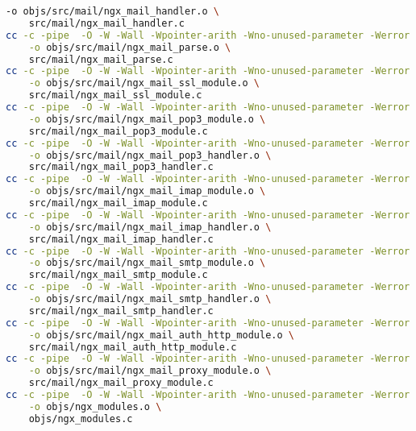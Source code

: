 \begin{lstlisting}[language=bash]
	-o objs/src/mail/ngx_mail_handler.o \
	src/mail/ngx_mail_handler.c
cc -c -pipe  -O -W -Wall -Wpointer-arith -Wno-unused-parameter -Werror -g  -I src/core -I src/event -I src/event/modules -I src/os/unix -I objs -I src/mail \
	-o objs/src/mail/ngx_mail_parse.o \
	src/mail/ngx_mail_parse.c
cc -c -pipe  -O -W -Wall -Wpointer-arith -Wno-unused-parameter -Werror -g  -I src/core -I src/event -I src/event/modules -I src/os/unix -I objs -I src/mail \
	-o objs/src/mail/ngx_mail_ssl_module.o \
	src/mail/ngx_mail_ssl_module.c
cc -c -pipe  -O -W -Wall -Wpointer-arith -Wno-unused-parameter -Werror -g  -I src/core -I src/event -I src/event/modules -I src/os/unix -I objs -I src/mail \
	-o objs/src/mail/ngx_mail_pop3_module.o \
	src/mail/ngx_mail_pop3_module.c
cc -c -pipe  -O -W -Wall -Wpointer-arith -Wno-unused-parameter -Werror -g  -I src/core -I src/event -I src/event/modules -I src/os/unix -I objs -I src/mail \
	-o objs/src/mail/ngx_mail_pop3_handler.o \
	src/mail/ngx_mail_pop3_handler.c
cc -c -pipe  -O -W -Wall -Wpointer-arith -Wno-unused-parameter -Werror -g  -I src/core -I src/event -I src/event/modules -I src/os/unix -I objs -I src/mail \
	-o objs/src/mail/ngx_mail_imap_module.o \
	src/mail/ngx_mail_imap_module.c
cc -c -pipe  -O -W -Wall -Wpointer-arith -Wno-unused-parameter -Werror -g  -I src/core -I src/event -I src/event/modules -I src/os/unix -I objs -I src/mail \
	-o objs/src/mail/ngx_mail_imap_handler.o \
	src/mail/ngx_mail_imap_handler.c
cc -c -pipe  -O -W -Wall -Wpointer-arith -Wno-unused-parameter -Werror -g  -I src/core -I src/event -I src/event/modules -I src/os/unix -I objs -I src/mail \
	-o objs/src/mail/ngx_mail_smtp_module.o \
	src/mail/ngx_mail_smtp_module.c
cc -c -pipe  -O -W -Wall -Wpointer-arith -Wno-unused-parameter -Werror -g  -I src/core -I src/event -I src/event/modules -I src/os/unix -I objs -I src/mail \
	-o objs/src/mail/ngx_mail_smtp_handler.o \
	src/mail/ngx_mail_smtp_handler.c
cc -c -pipe  -O -W -Wall -Wpointer-arith -Wno-unused-parameter -Werror -g  -I src/core -I src/event -I src/event/modules -I src/os/unix -I objs -I src/mail \
	-o objs/src/mail/ngx_mail_auth_http_module.o \
	src/mail/ngx_mail_auth_http_module.c
cc -c -pipe  -O -W -Wall -Wpointer-arith -Wno-unused-parameter -Werror -g  -I src/core -I src/event -I src/event/modules -I src/os/unix -I objs -I src/mail \
	-o objs/src/mail/ngx_mail_proxy_module.o \
	src/mail/ngx_mail_proxy_module.c
cc -c -pipe  -O -W -Wall -Wpointer-arith -Wno-unused-parameter -Werror -g  -I src/core -I src/event -I src/event/modules -I src/os/unix -I objs \
	-o objs/ngx_modules.o \
	objs/ngx_modules.c

\end{lstlisting}
